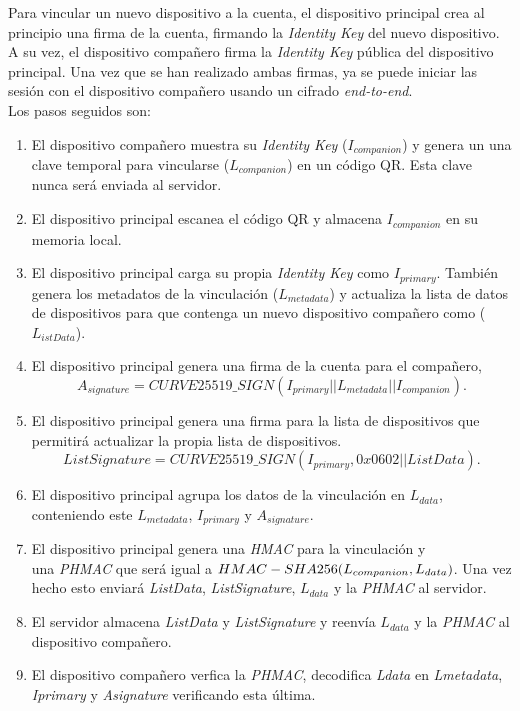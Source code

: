 \begin{description}
	Para vincular un nuevo dispositivo a la cuenta, el dispositivo principal crea al principio una firma de la cuenta, firmando la \emph{Identity Key} del nuevo dispositivo. A su vez, el dispositivo compañero firma la \emph{Identity Key} pública del dispositivo principal. Una vez que se han realizado ambas firmas, ya se puede iniciar las sesión con el dispositivo compañero usando un cifrado \emph{end-to-end}.\\Los pasos seguidos son:
	\begin{enumerate}
		\item El dispositivo compañero muestra su \emph{Identity Key} ($I_{companion}$) y genera un una clave temporal para vincularse ($L_{companion}$) en un código QR. Esta clave nunca será enviada al servidor.
		\item El dispositivo principal escanea el código QR y almacena $I_{companion}$ en su memoria local.
		\item El dispositivo principal carga su propia \emph{Identity Key} como $I_{primary}$. También genera los metadatos de la vinculación ($L_{metadata}$) y actualiza la lista de datos de dispositivos para que contenga un nuevo dispositivo compañero como ($L_{istData}$).
		\item El dispositivo principal genera una firma de la cuenta para el compañero, $$A_{signature}=CURVE25519\_SIGN(I_{primary} || L_{metadata} || I_{companion}).$$
		\item El dispositivo principal genera una firma para la lista de dispositivos que permitirá actualizar la propia lista de dispositivos. $$ListSignature = CURVE25519\_SIGN(I_{primary}, 0x0602 || ListData).$$
		\item El dispositivo principal agrupa los datos de la vinculación en $L_{data}$, conteniendo este $L_{metadata}$, $I_{primary}$ y $A_{signature}$.
		\item El dispositivo principal genera una \emph{HMAC} para la vinculación y\\ una \emph{PHMAC} que será igual a $HMAC-SHA256(L_{companion}\\, L_{data})$. Una vez hecho esto enviará \emph{ListData}, \emph{ListSignature}, $L_{data}$ y la \emph{PHMAC} al servidor.
		\item El servidor almacena \emph{ListData} y \emph{ListSignature} y reenvía $L_{data}$ y la \emph{PHMAC} al dispositivo compañero.
		\item El dispositivo compañero  verfica la \emph{PHMAC}, decodifica \emph{Ldata} en \emph{Lmetadata}, \emph{Iprimary} y \emph{Asignature} verificando esta última.

\end{enumerate}
\end{description}
